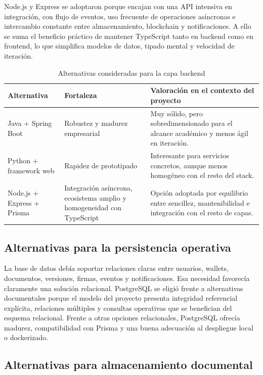 \documentclass[11pt, a4paper]{article}
\begin{document}
Node.js y Express se adoptaron porque encajan con una API intensiva en integración, con flujo de eventos, uso frecuente de operaciones asíncronas e intercambio constante entre almacenamiento, blockchain y notificaciones. A ello se suma el beneficio práctico de mantener TypeScript tanto en backend como en frontend, lo que simplifica modelos de datos, tipado mental y velocidad de iteración.

\begin{table}[H]
    \centering
    \small
    \begin{tabular}{|p{2.9cm}|p{3.1cm}|p{6.9cm}|}
    \hline
    \textbf{Alternativa} & \textbf{Fortaleza} & \textbf{Valoración en el contexto del proyecto} \\
    \hline
    Java + Spring Boot & Robustez y madurez empresarial & Muy sólido, pero sobredimensionado para el alcance académico y menos ágil en iteración. \\
    \hline
    Python + framework web & Rapidez de prototipado & Interesante para servicios concretos, aunque menos homogéneo con el resto del stack. \\
    \hline
    Node.js + Express + Prisma & Integración asíncrona, ecosistema amplio y homogeneidad con TypeScript & Opción adoptada por equilibrio entre sencillez, mantenibilidad e integración con el resto de capas. \\
    \hline
    \end{tabular}
    \caption{Alternativas consideradas para la capa backend}
    \label{tab:alternativas-backend}
\end{table}

\subsection{Alternativas para la persistencia operativa}

La base de datos debía soportar relaciones claras entre usuarios, wallets, documentos, versiones, firmas, eventos y notificaciones. Esa necesidad favorecía claramente una solución relacional. PostgreSQL se eligió frente a alternativas documentales porque el modelo del proyecto presenta integridad referencial explícita, relaciones múltiples y consultas operativas que se benefician del esquema relacional. Frente a otras opciones relacionales, PostgreSQL ofrecía madurez, compatibilidad con Prisma y una buena adecuación al despliegue local o dockerizado.

\subsection{Alternativas para almacenamiento documental}
\end{document}
